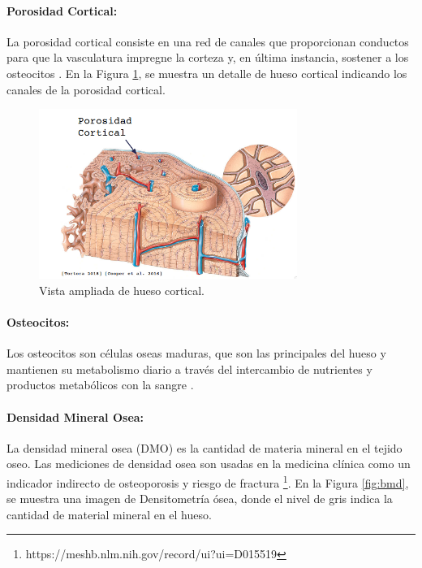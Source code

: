 \paragraph{Porosidad Cortical:}
La porosidad cortical consiste en una red de canales que proporcionan conductos para que la vasculatura impregne la corteza y, en última instancia, sostener a los osteocitos
\cite{Cooper2016}.
En la Figura \ref{fig:porosidad}, se muestra un detalle de hueso cortical indicando los canales de la porosidad cortical.

\begin{figure}[H]
    \centering
    \includegraphics[width=0.75\textwidth]{imagenes/porosidad.png}
    \caption{Vista ampliada de hueso cortical.}
    \label{fig:porosidad}
\end{figure}


\paragraph{Osteocitos:}
Los osteocitos son células oseas maduras, que son las principales del hueso y mantienen su metabolismo diario a través del intercambio de nutrientes y productos metabólicos con la sangre
\cite{tortora/derrickson2018}.

\paragraph{Densidad Mineral Osea:}
La densidad mineral osea (DMO) es la cantidad de materia mineral en el tejido oseo. Las mediciones de densidad osea son usadas en la medicina clínica como un indicador indirecto de osteoporosis y riesgo de fractura
\footnote{https://meshb.nlm.nih.gov/record/ui?ui=D015519}.
En la Figura \ref{fig:bmd}, se muestra una imagen de Densitometría ósea, donde el nivel de gris indica la cantidad de material mineral en el hueso.

